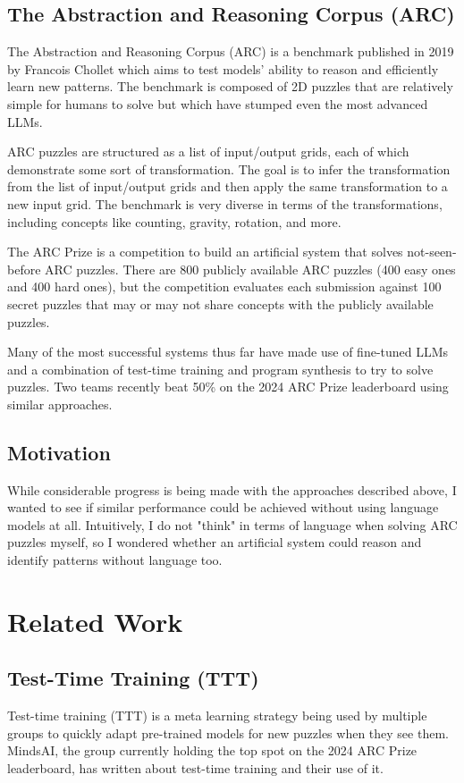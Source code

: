 \documentclass[10pt,twocolumn]{article}
\begin{document}
\subsection{The Abstraction and Reasoning Corpus (ARC)}
The Abstraction and Reasoning Corpus (ARC)\cite{arc} is a benchmark published
in 2019 by Francois Chollet which aims to test models' ability to
reason and efficiently learn new patterns. The benchmark is composed
of 2D puzzles that are relatively simple for humans to solve but
which have stumped even the most advanced LLMs.

ARC puzzles are structured as a list of
input/output grids, each of which demonstrate some sort of
transformation. The goal is to infer the transformation from the list
of input/output grids and then apply the same transformation to a new
input grid. The benchmark is very diverse in terms of the
transformations, including concepts like counting, gravity, rotation, and more.

The ARC Prize\cite{arcprize2024} is a competition to build an
artificial system that solves not-seen-before ARC puzzles. There are
800 publicly available ARC puzzles (400 easy ones and 400 hard ones),
but the competition evaluates each submission against 100 secret
puzzles that may or may not share concepts with the publicly available puzzles.

Many of the most successful systems thus far have made use of
fine-tuned LLMs and a combination of test-time training and program
synthesis to try to solve puzzles. Two teams recently beat 50\% on
the 2024 ARC Prize leaderboard using similar approaches.

\subsection{Motivation}
While considerable progress is being made with the approaches
described above, I wanted to see if similar performance could be achieved
without using language models at all. Intuitively, I do not "think"
in terms of language when solving ARC puzzles myself, so I wondered
whether an artificial system could reason and identify patterns
without language too.

\section{Related Work}

\subsection{Test-Time Training (TTT)}
Test-time training (TTT) is a meta learning strategy being used by
multiple groups to quickly adapt pre-trained models for new puzzles
when they see them. MindsAI, the group currently holding the top spot
on the 2024 ARC
Prize leaderboard, has written about test-time
training\cite{mindsai} and their use of it.
\end{document}
